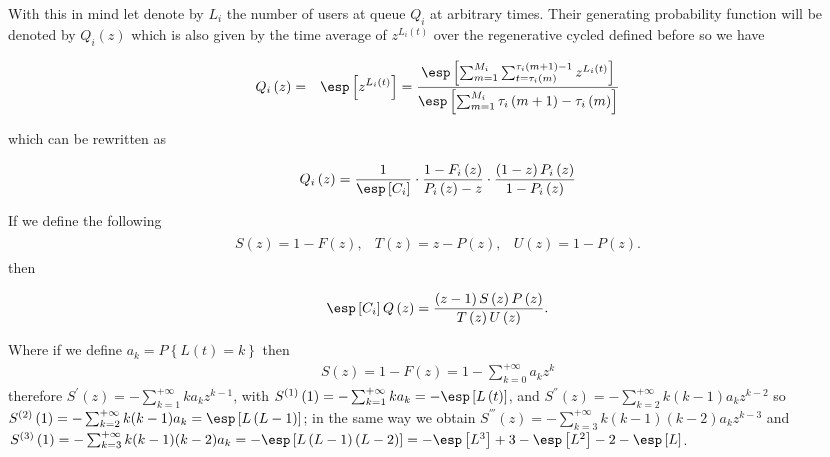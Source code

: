 With this in mind let denote by $L_{i}$ the number of users at queue $Q_{i}$ at arbitrary times. Their generating probability function  will be denoted by $Q_{i}\left(z\right)$ which is also given by the time average of $z^{L_{i}\left(t\right)}$ over the regenerative cycled defined before so we have

\begin{eqnarray*}
Q_{i}\left(z\right)&=&\esp\left[z^{L_{i}\left(t\right)}\right]=\frac{\esp\left[\sum_{m=1}^{M_{i}}\sum_{t=\tau_{i}\left(m\right)}^{\tau_{i}\left(m+1\right)-1}z^{L_{i}\left(t\right)}\right]}{\esp\left[\sum_{m=1}^{M_{i}}\tau_{i}\left(m+1\right)-\tau_{i}\left(m\right)\right]}
\end{eqnarray*}

which can be rewritten as

\begin{equation}\label{Eq.Long.Caulquier.Tiempo}
Q_{i}\left(z\right)=\frac{1}{\esp\left[C_{i}\right]}\cdot\frac{1-F_{i}\left(z\right)}{P_{i}\left(z\right)-z}\cdot\frac{\left(1-z\right)P_{i}\left(z\right)}{1-P_{i}\left(z\right)}
\end{equation}

If we define the following
\begin{eqnarray}
\begin{array}{ccc}
S\left(z\right)=1-F\left(z\right),&
T\left(z\right)=z-P\left(z\right),&
U\left(z\right)=1-P\left(z\right).
\end{array}
\end{eqnarray}
then 

\begin{eqnarray}
\esp\left[C_{i}\right]Q\left(z\right)=\frac{\left(z-1\right)S\left(z\right)P\left(z\right)}{T\left(z\right)U\left(z\right)}.
\end{eqnarray}

Where if we define $a_{k}=P\left\{L\left(t\right)=k\right\}$ then 
\begin{eqnarray*}
S\left(z\right)=1-F\left(z\right)=1-\sum_{k=0}^{+\infty}a_{k}z^{k}
\end{eqnarray*}
therefore $S^{'}\left(z\right)=-\sum_{k=1}^{+\infty}ka_{k}z^{k-1}$, with $S^{(1)}\left(1\right)=-\sum_{k=1}^{+\infty}ka_{k}=-\esp\left[L\left(t\right)\right]$,
and $S^{''}\left(z\right)=-\sum_{k=2}^{+\infty}k(k-1)a_{k}z^{k-2}$ so  $S^{(2)}\left(1\right)=-\sum_{k=2}^{+\infty}k(k-1)a_{k}=\esp\left[L\left(L-1\right)\right]$;
in the same way we obtain $S^{'''}\left(z\right)=-\sum_{k=3}^{+\infty}k(k-1)(k-2)a_{k}z^{k-3}$ and $S^{(3)}\left(1\right)=-\sum_{k=3}^{+\infty}k(k-1)(k-2)a_{k}=-\esp\left[L\left(L-1\right)\left(L-2\right)\right]
=-\esp\left[L^{3}\right]+3-\esp\left[L^{2}\right]-2-\esp\left[L\right]$. 

